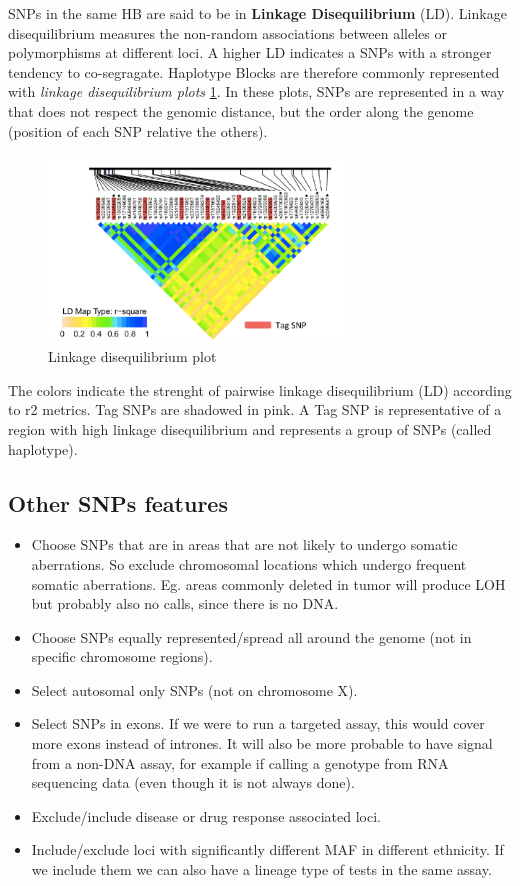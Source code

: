 SNPs in the same HB are said to be in \textbf{Linkage Disequilibrium} (LD). Linkage disequilibrium measures the non-random associations between alleles or polymorphisms at different loci. A higher LD indicates a SNPs with a stronger tendency to co-segragate.
Haplotype Blocks are therefore commonly represented with \emph{linkage disequilibrium plots} \ref{fig:LD_plot}. In these plots, SNPs are represented in a way that does not respect the genomic distance, but the order along the genome (position of each SNP relative the others). 

\begin{figure}
	\centering
	\includegraphics[width=0.7\textwidth]{Images/LD_plot.PNG}
	\caption{\label{fig:LD_plot}Linkage disequilibrium plot}
\end{figure}

The colors indicate the strenght of pairwise linkage disequilibrium (LD) according to r2 metrics. 
Tag SNPs are shadowed in pink. A Tag SNP is representative of a region with high linkage disequilibrium and represents a group of SNPs (called haplotype).


\subsection*{Other SNPs features} 
\begin{itemize}
	\item Choose SNPs that are in areas that are not likely to undergo somatic aberrations. So exclude chromosomal locations which undergo frequent somatic aberrations. Eg. areas commonly deleted in tumor will produce LOH but probably also no calls, since there is no DNA. 
	\item Choose SNPs equally represented/spread all around the genome (not in specific chromosome regions).
	\item Select autosomal only SNPs (not on chromosome X).
	\item Select SNPs in exons. If we were to run a targeted assay, this would cover more exons instead of intrones. It will also be more probable to have signal from a non-DNA assay, for example if calling a genotype from RNA sequencing data (even though it is not always done).
	\item Exclude/include disease or drug response associated loci. 
	\item Include/exclude loci with significantly different MAF in different ethnicity. If we include them we can also have a lineage type of tests in the same assay. 
\end{itemize}


